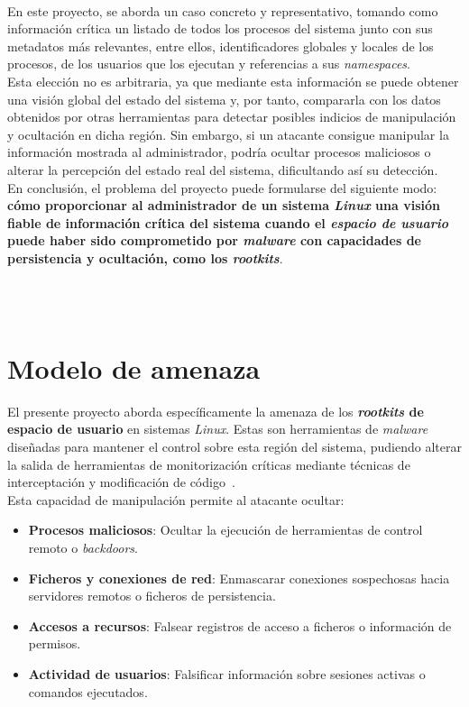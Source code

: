 \

En este proyecto, se aborda un caso concreto y representativo, tomando como información crítica un listado de todos los procesos del sistema junto con sus metadatos más relevantes, entre ellos, identificadores globales y locales de los procesos, de los usuarios que los ejecutan y referencias a sus \textit{namespaces}.\\

Esta elección no es arbitraria, ya que mediante esta información se puede obtener una visión global del estado del sistema y, por tanto, compararla con los datos obtenidos por otras herramientas para detectar posibles indicios de manipulación y ocultación en dicha región.
Sin embargo, si un atacante consigue manipular la información mostrada al administrador, podría ocultar procesos maliciosos o alterar la percepción del estado real del sistema, dificultando así su detección.\\

En conclusión, el problema del proyecto puede formularse del siguiente modo: \textbf{cómo proporcionar al administrador de un sistema \textit{Linux} una visión fiable de información crítica del sistema cuando el \textit{espacio de usuario} puede haber sido comprometido por \textit{malware} con capacidades de persistencia y ocultación, como los \textit{rootkits}}.\\

\

\

\section{Modelo de amenaza}
\label{sec:modelo-amenaza}

El presente proyecto aborda específicamente la amenaza de los \textbf{\textit{rootkits} de espacio de usuario} en sistemas \textit{Linux}.
Estas son herramientas de \textit{malware} diseñadas para mantener el control sobre esta región del sistema, pudiendo alterar la salida de herramientas de monitorización críticas mediante técnicas de interceptación y modificación de código~\cite{rootkits}.\\

Esta capacidad de manipulación permite al atacante ocultar:

\begin{itemize}
    \item \textbf{Procesos maliciosos}: Ocultar la ejecución de herramientas de control remoto o \textit{backdoors}.
    \item \textbf{Ficheros y conexiones de red}: Enmascarar conexiones sospechosas hacia servidores remotos o ficheros de persistencia.
    \item \textbf{Accesos a recursos}: Falsear registros de acceso a ficheros o información de permisos.
    \item \textbf{Actividad de usuarios}: Falsificar información sobre sesiones activas o comandos ejecutados.
\end{itemize}

